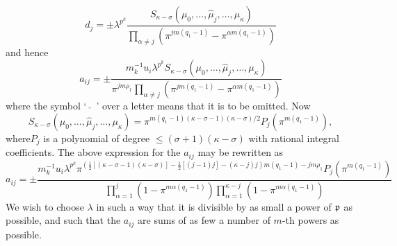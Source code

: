 $$
d_j = \pm \lambda^{p^k} \dfrac{S_{\kappa -\sigma} (\mu_0, \ldots, \hat{\mu}_j, \ldots, \mu_\kappa)}{\prod\limits_{\alpha \neq j} (\pi^{jm(q_1-1)} - \pi^{\alpha m (q_1-1)})}
$$
and hence 
$$
a_{ij} = \pm \dfrac{m_k^{-1} u_i \lambda^{p^k} S_{\kappa -\sigma} (\mu_0, \ldots, \hat{\mu}_j,\ldots, \mu_\kappa)}{\pi^{jm\rho_1} \prod\limits_{\alpha \neq j} (\pi^{jm (q_1-1)} - \pi^{\alpha m (q_1-1)})}
$$
where the symbol `~$\hat{}$~' over a letter means that it is to be omitted. Now 
$$
S_{\kappa -\sigma} (\mu_0,\ldots, \hat{\mu}_j,\ldots, \mu_\kappa) = \pi^{m(q_1-1) (\kappa - \sigma -1) (\kappa-\sigma)/2} P_j(\pi^{m(q_1-1)}),
$$
where\pageoriginale $P_j$ is a polynomial of degree $\leq (\sigma +1) (\kappa - \sigma)$ with rational integral coefficients. The above expression for the $a_{ij}$ may be rewritten as 
$$
a_{ij} = \pm \dfrac{m_k^{-1} u_i\lambda^{p^k} \pi^{(\frac{1}{2}[(\kappa - \sigma -1)(\kappa -\sigma)] - \frac{1}{2} [(j-1)j] - (\kappa - j)j) m (q_1 -1) - jm \rho_1 } P_j (\pi^{m(q_1-1)})}{\prod^j_{\alpha =1} (1-\pi^{m\alpha (q_1-1)}) \prod\limits^{\kappa - j}_{\alpha =1} (1 -\pi^{m\alpha (q_1-1)})}
$$
We wish to choose $\lambda$ in such a way that it is divisible by as small a power of $\mathfrak{p}$ as possible, and such that the $a_{ij}$ are sums of as few a number of $m$-th powers as possible.

